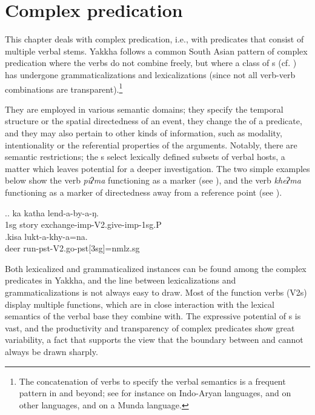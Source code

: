 \chapter{Complex predication}\label{verb-verb}

This chapter deals with complex predication, i.e., with predicates that consist of multiple verbal  stems. Yakkha follows a common South Asian pattern of complex predication where the verbs do not combine freely, but where  a class of s (cf. \citealt{Schultze-Berndt2006_Taking}) has undergone grammaticalizations and lexicalizations (since not all verb-verb combinations are transparent).\footnote{The concatenation of verbs to specify the verbal semantics is a frequent pattern in  and beyond; see for instance \citet{Butt1995The-structure, Hook1991_Emergence, Masica2001The-definition, Nespital1997Hindi, Pokharel1999Compound} on Indo-Aryan languages, and \citet{Matisoff1969The-syntax, DeLancey1991The-origin,  Bickel1996Aspect, Ebert1997A-grammar, Doornenbal2009A-grammar, Kansakar2005Classical} on other  languages, and \citet{Peterson2010_Kharia} on a Munda language.}

 They are employed in various semantic domains; they specify the temporal structure or the spatial directedness of an event, they change the  of a predicate, and  they may also pertain to other kinds of information, such as modality, intentionality or the  referential properties of the arguments. Notably, there are semantic restrictions; the s select lexically defined subsets of verbal hosts, a matter which leaves potential for a deeper investigation. The two simple examples below show the verb \emph{piʔma}  functioning as a  marker (see \Next[a]), and the verb \emph{kheʔma}  functioning as a marker of directedness away from a reference point (see \Next[b]).
 
 	\ex.\ag. ka katha lend-a-by-a-ŋ.\\
	{\sc 1sg} story  exchange{\sc -imp-V2.give-imp-1sg.P}\\
	\bg.kisa lukt-a-khy-a=na.\\
	deer run{\sc -pst-V2.go-pst[3sg]=nmlz.sg}\\
 
 

Both lexicalized and grammaticalized instances can be found among the complex predicates in Yakkha, and the line between lexicalizations and grammaticalizations is not always easy to draw. Most of the function verbs (V2s) display multiple functions, which are in close interaction with the lexical semantics of the verbal base they combine with. The expressive potential of s is vast, and the productivity and transparency of complex predicates show great variability, a fact that supports the view that the boundary between  and  cannot always be drawn sharply. 

